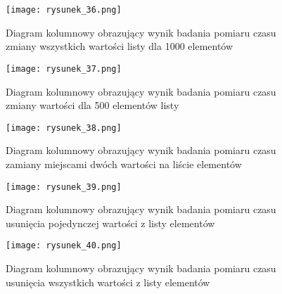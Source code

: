 \begin{figure}[!ht]
    \centering
    \texttt{[image: rysunek\_36.png]}
    \caption{Diagram kolumnowy obrazujący wynik badania pomiaru czasu zmiany wszystkich wartości listy dla 1000 elementów}
    \label{fig:rysunek_36}
\end{figure}

\begin{figure}[!ht]
    \centering
    \texttt{[image: rysunek\_37.png]}
    \caption{Diagram kolumnowy obrazujący wynik badania pomiaru czasu zmiany wartości dla 500 elementów listy}
    \label{fig:rysunek_37}
\end{figure}

\begin{figure}[!ht]
    \centering
    \texttt{[image: rysunek\_38.png]}
    \caption{Diagram kolumnowy obrazujący wynik badania pomiaru czasu zamiany miejscami dwóch wartości na liście elementów}
    \label{fig:rysunek_38}
\end{figure}

\begin{figure}[!ht]
    \centering
    \texttt{[image: rysunek\_39.png]}
    \caption{Diagram kolumnowy obrazujący wynik badania pomiaru czasu usunięcia pojedynczej wartości z listy elementów}
    \label{fig:rysunek_39}
\end{figure}

\begin{figure}[!ht]
    \centering
    \texttt{[image: rysunek\_40.png]}
    \caption{Diagram kolumnowy obrazujący wynik badania pomiaru czasu usunięcia wszystkich wartości z listy elementów}
    \label{fig:rysunek_40}
\end{figure}

\let\cleardoublepage\clearpage